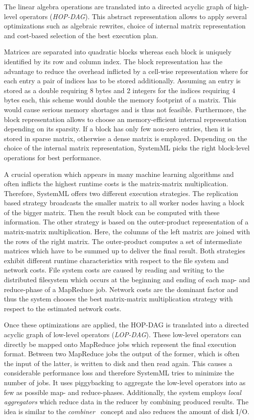 The linear algebra operations are translated into a directed acyclic graph of high-level operators (\emph{HOP-DAG}).
This abstract representation allows to apply several optimizations such as algebraic rewrites, choice of internal matrix representation and cost-based selection of the best execution plan.

Matrices are separated into quadratic blocks whereas each block is uniquely identified by its row and column index.
The block representation has the advantage to reduce the overhead inflicted by a cell-wise representation where for each entry a pair of indices has to be stored additionally.
Assuming an entry is stored as a double requiring 8 bytes and 2 integers for the indices requiring 4 bytes each, this scheme would double the memory footprint of a matrix.
This would cause serious memory shortages and is thus not feasible.
Furthermore, the block representation allows to choose an memory-efficient internal representation depending on its sparsity.
If a block has only few non-zero entries, then it is stored in sparse matrix, otherwise a dense matrix is employed.
Depending on the choice of the internal matrix representation, SystemML picks the right block-level operations for best performance.

A crucial operation which appears in many machine learning algorithms and often inflicts the highest runtime costs is the matrix-matrix multiplication.
Therefore, SystemML offers two different execution strategies.
The replication based strategy broadcasts the smaller matrix to all worker nodes having a block of the bigger matrix.
Then the result block can be computed with these information.
The other strategy is based on the outer-product representation of a matrix-matrix multiplication.
Here, the columns of the left matrix are joined with the rows of the right matrix.
The outer-product computes a set of intermediate matrices which have to be summed up to deliver the final result.
Both strategies exhibit different runtime characteristics with respect to the file system and network costs.
File system costs are caused by reading and writing to the distributed filesystem which occurs at the beginning and ending of each map- and reduce-phase of a MapReduce job.
Network costs are the dominant factor and thus the system chooses the best matrix-matrix multiplication strategy with respect to the estimated network costs.

Once these optimizations are applied, the HOP-DAG is translated into a directed acyclic graph of low-level operators (\emph{LOP-DAG}).
These low-level operators can directly be mapped onto MapReduce jobs which represent the final execution format.
Between two MapReduce jobs the output of the former, which is often the input of the latter, is written to disk and then read again.
This causes a considerable performance loss and therefore SystemML tries to minimize the number of jobs.
It uses piggybacking to aggregate the low-level operators into as few as possible map- and reduce-phases.
Additionally, the system employs \emph{local aggregators} which reduce data in the reducer by combining produced results.
The idea is similar to the \emph{combiner}~\cite{dean:c2008a} concept and also reduces the amount of disk I/O.

